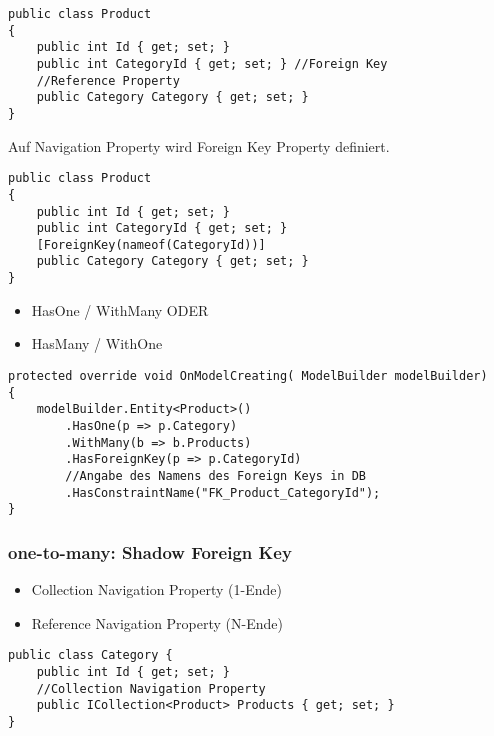 \begin{multicols*}{2}
\begin{lstlisting}
public class Product
{
    public int Id { get; set; }
    public int CategoryId { get; set; } //Foreign Key
    //Reference Property
    public Category Category { get; set; } 
}
\end{lstlisting}
Auf Navigation Property wird Foreign Key Property definiert.
\begin{lstlisting}
public class Product
{
    public int Id { get; set; }
    public int CategoryId { get; set; } 
    [ForeignKey(nameof(CategoryId))] 
    public Category Category { get; set; }
}    
\end{lstlisting}
\begin{itemize}
    \item HasOne / WithMany ODER
    \item HasMany / WithOne
\end{itemize}
\begin{lstlisting}
protected override void OnModelCreating( ModelBuilder modelBuilder)
{
    modelBuilder.Entity<Product>()
        .HasOne(p => p.Category)
        .WithMany(b => b.Products)
        .HasForeignKey(p => p.CategoryId) 
        //Angabe des Namens des Foreign Keys in DB
        .HasConstraintName("FK_Product_CategoryId");
}
\end{lstlisting}
\subsubsection{one-to-many: Shadow Foreign Key}
\begin{itemize}
    \item Collection Navigation Property (1-Ende)
    \item Reference Navigation Property (N-Ende)
\end{itemize}
\begin{lstlisting}
public class Category {
    public int Id { get; set; }
    //Collection Navigation Property
    public ICollection<Product> Products { get; set; } 
}


\end{lstlisting}
\end{multicols*}
